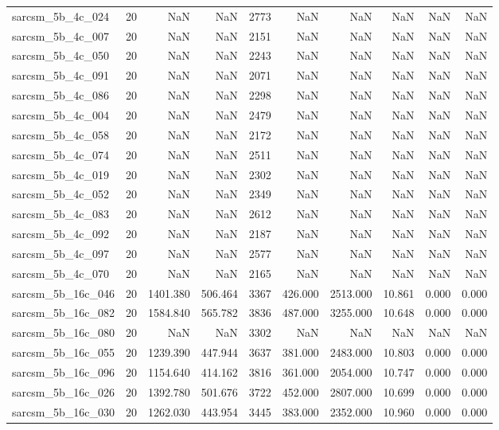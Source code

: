 \begin{tabular}{lrrrrrrrrr}
sarcsm\_5b\_4c\_024 & 20 & NaN & NaN & 2773 & NaN & NaN & NaN & NaN & NaN \\
sarcsm\_5b\_4c\_007 & 20 & NaN & NaN & 2151 & NaN & NaN & NaN & NaN & NaN \\
sarcsm\_5b\_4c\_050 & 20 & NaN & NaN & 2243 & NaN & NaN & NaN & NaN & NaN \\
sarcsm\_5b\_4c\_091 & 20 & NaN & NaN & 2071 & NaN & NaN & NaN & NaN & NaN \\
sarcsm\_5b\_4c\_086 & 20 & NaN & NaN & 2298 & NaN & NaN & NaN & NaN & NaN \\
sarcsm\_5b\_4c\_004 & 20 & NaN & NaN & 2479 & NaN & NaN & NaN & NaN & NaN \\
sarcsm\_5b\_4c\_058 & 20 & NaN & NaN & 2172 & NaN & NaN & NaN & NaN & NaN \\
sarcsm\_5b\_4c\_074 & 20 & NaN & NaN & 2511 & NaN & NaN & NaN & NaN & NaN \\
sarcsm\_5b\_4c\_019 & 20 & NaN & NaN & 2302 & NaN & NaN & NaN & NaN & NaN \\
sarcsm\_5b\_4c\_052 & 20 & NaN & NaN & 2349 & NaN & NaN & NaN & NaN & NaN \\
sarcsm\_5b\_4c\_083 & 20 & NaN & NaN & 2612 & NaN & NaN & NaN & NaN & NaN \\
sarcsm\_5b\_4c\_092 & 20 & NaN & NaN & 2187 & NaN & NaN & NaN & NaN & NaN \\
sarcsm\_5b\_4c\_097 & 20 & NaN & NaN & 2577 & NaN & NaN & NaN & NaN & NaN \\
sarcsm\_5b\_4c\_070 & 20 & NaN & NaN & 2165 & NaN & NaN & NaN & NaN & NaN \\
sarcsm\_5b\_16c\_046 & 20 & 1401.380 & 506.464 & 3367 & 426.000 & 2513.000 & 10.861 & 0.000 & 0.000 \\
sarcsm\_5b\_16c\_082 & 20 & 1584.840 & 565.782 & 3836 & 487.000 & 3255.000 & 10.648 & 0.000 & 0.000 \\
sarcsm\_5b\_16c\_080 & 20 & NaN & NaN & 3302 & NaN & NaN & NaN & NaN & NaN \\
sarcsm\_5b\_16c\_055 & 20 & 1239.390 & 447.944 & 3637 & 381.000 & 2483.000 & 10.803 & 0.000 & 0.000 \\
sarcsm\_5b\_16c\_096 & 20 & 1154.640 & 414.162 & 3816 & 361.000 & 2054.000 & 10.747 & 0.000 & 0.000 \\
sarcsm\_5b\_16c\_026 & 20 & 1392.780 & 501.676 & 3722 & 452.000 & 2807.000 & 10.699 & 0.000 & 0.000 \\
sarcsm\_5b\_16c\_030 & 20 & 1262.030 & 443.954 & 3445 & 383.000 & 2352.000 & 10.960 & 0.000 & 0.000 \\

\end{tabular}
